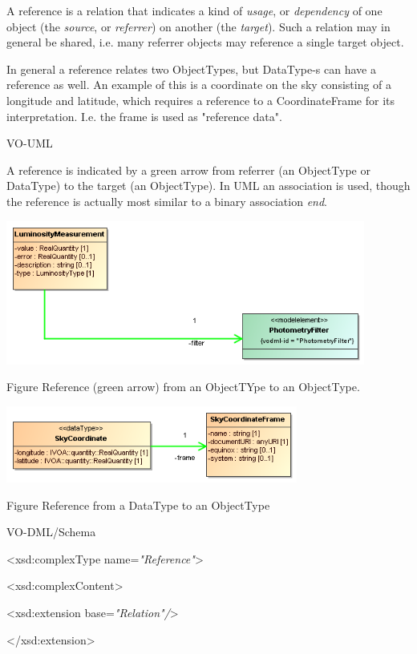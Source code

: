 \documentclass[10pt,a4paper]{ivoa}
\begin{document}
A reference is a relation that indicates a kind of \emph{usage}, or
\emph{dependency} of one object (the \emph{source}, or \emph{referrer})
on another (the \emph{target}). Such a relation may in general be
shared, i.e. many referrer objects may reference a single target object.

In general a reference relates two ObjectTypes, but DataType-s can have
a reference as well. An example of this is a coordinate on the sky
consisting of a longitude and latitude, which requires a reference to a
CoordinateFrame for its interpretation. I.e. the frame is used as
"reference data".

VO-UML

A reference is indicated by a green arrow from referrer (an ObjectType
or DataType) to the target (an ObjectType). In UML an association is
used, though the reference is actually most similar to a binary
association \emph{end}.

\includegraphics[width=4.64167in,height=1.86667in]{./media/image20.png}

Figure Reference (green arrow) from an ObjectTYpe to an ObjectType.

\includegraphics[width=3.76667in,height=0.99167in]{./media/image15.png}

Figure Reference from a DataType to an ObjectType

VO-DML/Schema

\textless xsd:complexType name=\emph{"Reference"}\textgreater{}

\textless xsd:complexContent\textgreater{}

\textless xsd:extension base=\emph{"Relation"/}\textgreater{}

\textless/xsd:extension\textgreater{}
\end{document}
